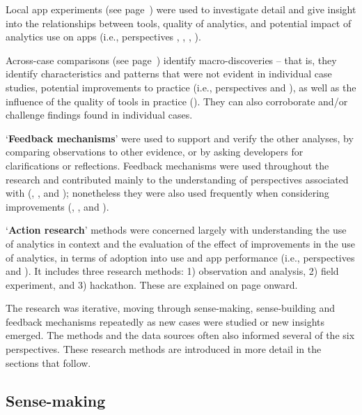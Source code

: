 Local app experiments (see page~\pageref{local-app-experiments-research-method}) were used to investigate detail and give insight into the relationships between tools, quality of analytics, and potential impact of analytics use on apps (i.e., perspectives \uartefacts, \utools, \iartefacts, \itools).

Across-case comparisons (see page~\pageref{across-case-comparisons-research-method}) identify macro-discoveries -- that is, they identify characteristics and patterns that were not evident in individual case studies, potential improvements to practice (i.e., perspectives \uuse and \iuse), as well as the influence of the quality of tools in practice (\itools). They can also corroborate and/or challenge findings found in individual cases.


`\textbf{Feedback mechanisms}' were used to support and verify the other analyses, by comparing observations to other evidence, or by asking developers for clarifications or reflections. Feedback mechanisms were used throughout the research and contributed mainly to the understanding of perspectives associated with (\uuse, \uartefacts, and \utools); nonetheless they were also used frequently when considering improvements (\iuse, \iartefacts, and \itools). 

`\textbf{Action research}' methods were concerned largely with understanding the use of analytics in context and the evaluation of the effect of improvements in the use of analytics, in terms of adoption into use and app performance (i.e., perspectives \iuse and \iartefacts). It includes three research methods: 1) observation and analysis, 2) field experiment, and 3) hackathon. These are explained on page \pageref{section-evaluation-through-action-research-method} onward. 

The research was iterative, moving through sense-making, sense-building and feedback mechanisms repeatedly as new cases were studied or new insights emerged.  The methods and the data sources often also informed several of the six perspectives.  These research methods are introduced in more detail in the sections that follow.

\subsection{Sense-making}

